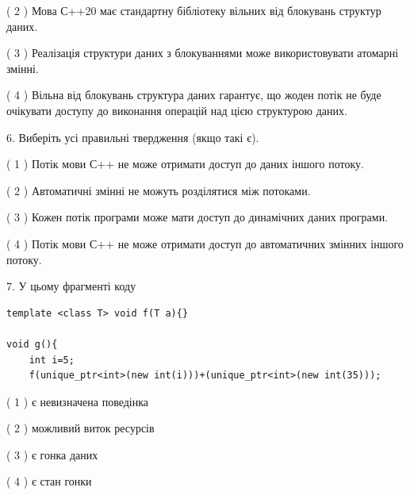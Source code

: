 \documentclass[12pt, ukrainian]{article}
\begin{document}
\begin {large}
{( 2 ) Мова С++20 має стандартну бібліотеку вільних від блокувань структур даних.%

( 3 ) Реалізація структури даних з блокуваннями може використовувати атомарні змінні.%

( 4 ) Вільна від блокувань структура даних гарантує, що жоден потік не буде очікувати доступу до виконання операцій над цією структурою даних.%
\newpage



\vspace{5mm}
6. Виберіть усі правильні твердження (якщо такі є).\par
\vspace{2mm}

( 1 ) Потік мови С++ не може отримати доступ до даних іншого потоку.%

( 2 ) Автоматичні змінні не можуть розділятися між потоками.%

( 3 ) Кожен потік програми може мати доступ до динамічних даних програми.%

( 4 ) Потік мови С++ не може отримати доступ до автоматичних змінних іншого потоку.%


\vspace{5mm}
7. У цьому фрагменті коду
\begin{verbatim}
template <class T> void f(T a){}

void g(){
    int i=5;
    f(unique_ptr<int>(new int(i)))+(unique_ptr<int>(new int(35)));
\end{verbatim}
( 1 ) є невизначена поведінка%

( 2 ) можливий виток ресурсів%

( 3 ) є гонка даних%

( 4 ) є стан гонки%
}
\end {large}
\end{document}
